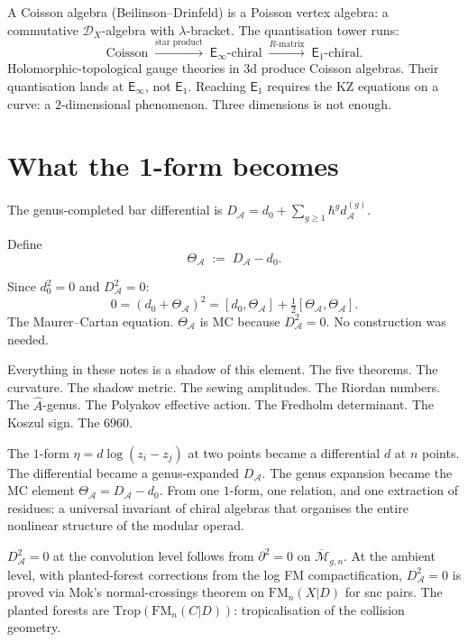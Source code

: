 \documentclass[11pt]{article}
\newcommand{\cA}{\mathcal{A}}
\newcommand{\cM}{\mathcal{M}}
\newcommand{\cD}{\mathcal{D}}
\newcommand{\Eone}{\mathsf{E}_1}
\newcommand{\Einf}{\mathsf{E}_{\infty}}
\newcommand{\FM}{\mathrm{FM}}
\begin{document}
A Coisson algebra (Beilinson--Drinfeld) is a Poisson vertex algebra:
a commutative $\cD_X$-algebra with $\lambda$-bracket.  The
quantisation tower runs:
\[
\text{Coisson}
\;\xrightarrow{\text{star product}}\;
\Einf\text{-chiral}
\;\xrightarrow{R\text{-matrix}}\;
\Eone\text{-chiral}.
\]
Holomorphic-topological gauge theories in $3$d produce Coisson
algebras.  Their quantisation lands at $\Einf$, not $\Eone$.
Reaching $\Eone$ requires the KZ equations on a curve: a
$2$-dimensional phenomenon.  Three dimensions is not enough.


\section{What the 1-form becomes}
\label{sec:what-it-becomes}

The genus-completed bar differential is
$D_\cA = d_0 + \sum_{g \geq 1} \hbar^g d_\cA^{(g)}$.

Define
\begin{equation}\label{eq:theta}
\Theta_\cA \;:=\; D_\cA - d_0.
\end{equation}

Since $d_0^2 = 0$ and $D_\cA^2 = 0$:
\[
0 = (d_0 + \Theta_\cA)^2
= [d_0, \Theta_\cA] + \tfrac{1}{2}[\Theta_\cA, \Theta_\cA].
\]
The Maurer--Cartan equation.  $\Theta_\cA$ is MC
because $D_\cA^2 = 0$.  No construction was needed.

Everything in these notes is a shadow of this element.
The five theorems.  The curvature.  The shadow metric.  The
sewing amplitudes.  The Riordan numbers.  The $\hat{A}$-genus.
The Polyakov effective action.  The Fredholm determinant.  The
Koszul sign.  The $6960$.

The $1$-form $\eta = d\log(z_i - z_j)$ at two points became a
differential $d$ at $n$ points.  The differential became a
genus-expanded $D_\cA$.  The genus expansion became the MC
element $\Theta_\cA = D_\cA - d_0$.  From one $1$-form, one
relation, and one extraction of residues: a universal invariant
of chiral algebras that organises the entire nonlinear structure
of the modular operad.

$D_\cA^2 = 0$ at the convolution level follows from
$\partial^2 = 0$ on $\overline{\cM}_{g,n}$.  At the ambient
level, with planted-forest corrections from the log FM
compactification, $D_\cA^2 = 0$ is proved via Mok's
normal-crossings theorem on $\FM_n(X|D)$ for snc pairs.
The planted forests are $\mathrm{Trop}(\FM_n(C|D))$:
tropicalisation of the collision geometry.
\end{document}
